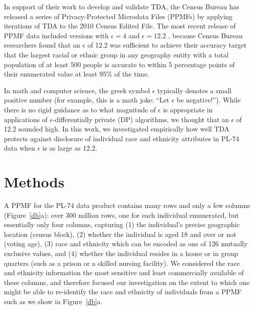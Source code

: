 \documentclass{article}
\begin{document}
In support of their work to develop and validate TDA,  the Census Bureau has released a series of Privacy-Protected Microdata Files (PPMFs) by applying iterations of TDA to the 2010 Census Edited File.  The most recent release of PPMF data included versions with $\epsilon=4$ and $\epsilon=12.2$ \cite{census2021developing}, because
Census Bureau researchers found that an $\epsilon$ of 12.2 was sufficient to achieve their accuracy target that the largest racial or ethnic group in any geography entity with a total population of at least 500 people is accurate to within 5 percentage points of their enumerated value at least 95\% of the time.

In math and computer science, the greek symbol $\epsilon$ typically denotes a small positive number (for example, this is a math joke: ``Let $\epsilon$ be negative!'').  While there is no rigid guidance as to what magnitude of $\epsilon$ is appropriate in applications of $\epsilon$-differentially private (DP) algorithms, we thought that an $\epsilon$ of 12.2 sounded high. In this work, we investigated empirically how well TDA protects against disclosure of individual race and ethnicity attributes in PL-74 data when $\epsilon$ is as large as 12.2.

\section{Methods}
A PPMF for the PL-74 data product contains many rows and only a few columns (Figure~\ref{db}a): over 300 million rows, one for each individual enumerated, but essentially only four columns, capturing (1) the individual's precise geographic location (census block), (2) whether the individual is aged 18 and over or not (voting age), (3) race and ethnicity which can be encoded as one of 126 mutually exclusive values, and (4) whether the individual resides in a house or in group quarters (such as a prison or a skilled nursing facility).  We considered the race and ethnicity information the most sensitive and least commercially available of these columns, and therefore focused our investigation on the extent to which one might be able to re-identify the race and ethnicity of individuals from a PPMF such as we show in Figure~\ref{db}a.
\end{document}
